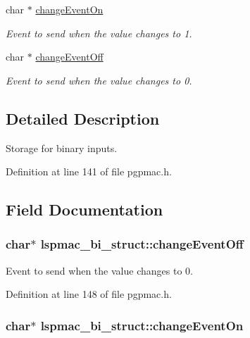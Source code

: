 \begin{DoxyCompactItemize}
char $\ast$ \hyperlink{structlspmac__bi__struct_ae7178007dfdf21be0e5b1fbaa36732af}{change\-Event\-On}
\begin{DoxyCompactList}\small\item\em Event to send when the value changes to 1. \end{DoxyCompactList}\item 
char $\ast$ \hyperlink{structlspmac__bi__struct_ae0859842f637694ace0e6d54c0e2af6a}{change\-Event\-Off}
\begin{DoxyCompactList}\small\item\em Event to send when the value changes to 0. \end{DoxyCompactList}\end{DoxyCompactItemize}


\subsection{Detailed Description}
Storage for binary inputs. 

Definition at line 141 of file pgpmac.\-h.



\subsection{Field Documentation}
\hypertarget{structlspmac__bi__struct_ae0859842f637694ace0e6d54c0e2af6a}{
\subsubsection[{change\-Event\-Off}]{\setlength{\rightskip}{0pt plus 5cm}char$\ast$ lspmac\-\_\-bi\-\_\-struct\-::change\-Event\-Off}}\label{structlspmac__bi__struct_ae0859842f637694ace0e6d54c0e2af6a}


Event to send when the value changes to 0. 



Definition at line 148 of file pgpmac.\-h.

\hypertarget{structlspmac__bi__struct_ae7178007dfdf21be0e5b1fbaa36732af}{
\subsubsection[{change\-Event\-On}]{\setlength{\rightskip}{0pt plus 5cm}char$\ast$ lspmac\-\_\-bi\-\_\-struct\-::change\-Event\-On}}\label{structlspmac__bi__struct_ae7178007dfdf21be0e5b1fbaa36732af}


